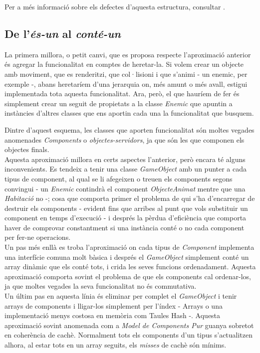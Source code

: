 \begin{description}
\end{description}

Per a més informació sobre els defectes d'aquesta estructura, consultar \cite{Wilson02}.

\subsection{De l'{\em és-un} al {\em conté-un}}

La primera millora, o petit canvi, que es proposa respecte l'aproximació anterior és agregar la funcionalitat en comptes de heretar-la. Si volem crear un objecte amb moviment, que es renderitzi, que col·lisioni i que s'animi - un enemic, per exemple -, abans heretaríem d'una jerarquia on, més amunt o més avall, estigui implementada tota aquesta funcionalitat. Ara, però, el que hauríem de fer és simplement crear un seguit de propietats a la classe {\em Enemic} que apuntin a instàncies d'altres classes que ens aportin cada una la funcionalitat que busquem.

Dintre d'aquest esquema, les classes que aporten funcionalitat són moltes vegades anomenades {\em Components} o {\em objectes-servidors}, ja que són les que componen els objectes finals.
\\

Aquesta aproximació millora en certs aspectes l'anterior, però encara té alguns inconvenients. Es tendeix a tenir una classe {\em GameObject} amb un punter a cada tipus de component, al qual se li afegeixen o treuen els components segons convingui - un {\em Enemic} contindrà el component {\em ObjecteAnimat} mentre que una {\em Habitació} no -; cosa que comporta primer el problema de qui s'ha d'encarregar de destruir els components - evident fins que arribes al punt que vols substituir un component en temps d'execució - i després la pèrdua d'eficiència que comporta haver de comprovar constantment si una instància conté o no cada component per fer-ne operacions.
\\

Un pas més enllà es troba l'aproximació on cada tipus de {\em Component} implementa una interfície comuna molt bàsica i després el {\em GameObject} simplement conté un array dinàmic que els conté tots, i crida les seves funcions ordenadament. Aquesta aproximació comporta sovint el problema de que els components cal ordenar-los, ja que moltes vegades la seva funcionalitat no és commutativa.
\\

Un últim pas en aquesta línia és eliminar per complet el {\em GameObject} i tenir arrays de components i lligar-los simplement per l'índex - Arrays o una implementació menys costosa en memòria com Taules Hash -. Aquesta aproximació sovint anomenada com a {\em Model de Components Pur} guanya sobretot en coherència de cachè. Normalment tots els components d'un tipus s'actualitzen alhora, al estar tots en un array seguits, els {\em misses} de cachè són mínims.
\\


